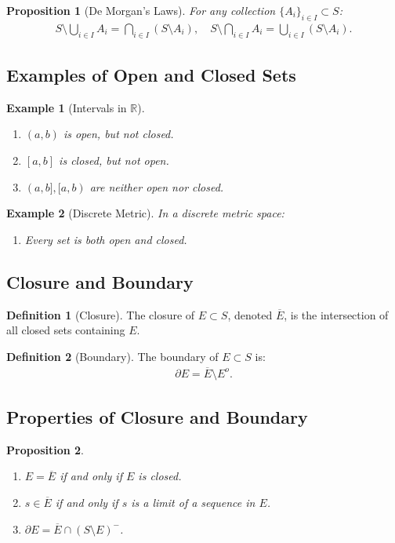 \documentclass[9pt]{article}
\theoremstyle{definition}
\newtheorem{definition}{Definition}
\theoremstyle{plain}
\newtheorem{proposition}{Proposition}
\newtheorem{example}{Example}
\begin{document}
\begin{proposition}[De Morgan's Laws]
For any collection $ \{A_i\}_{i \in I} \subset S $:
\begin{align}
S \setminus \bigcup_{i \in I} A_i = \bigcap_{i \in I} (S \setminus A_i), \quad S \setminus \bigcap_{i \in I} A_i = \bigcup_{i \in I} (S \setminus A_i).
\end{align}
\end{proposition}

\subsection*{Examples of Open and Closed Sets}
\begin{example}[Intervals in $ \mathbb{R} $]

\begin{enumerate}
    \item $ (a, b) $ is open, but not closed.
    \item $ [a, b] $ is closed, but not open.
    \item $ (a, b], [a, b) $ are neither open nor closed.
\end{enumerate}
\end{example}

\begin{example}[Discrete Metric]
In a discrete metric space:
\begin{enumerate}
    \item Every set is both open and closed.
\end{enumerate}
\end{example}

\subsection*{Closure and Boundary}
\begin{definition}[Closure]
The closure of $ E \subset S $, denoted $ \overline{E} $, is the intersection of all closed sets containing $ E $.
\end{definition}

\begin{definition}[Boundary]
The boundary of $ E \subset S $ is:
\begin{align}
\partial E = \overline{E} \setminus E^o.
\end{align}
\end{definition}

\subsection*{Properties of Closure and Boundary}
\begin{proposition}

\begin{enumerate}
    \item $ E = \overline{E} $ if and only if $ E $ is closed.
    \item $ s \in \overline{E} $ if and only if $ s $ is a limit of a sequence in $ E $.
    \item $ \partial E = \overline{E} \cap (S \setminus E)^- $.
\end{enumerate}
\end{proposition}
\end{document}
